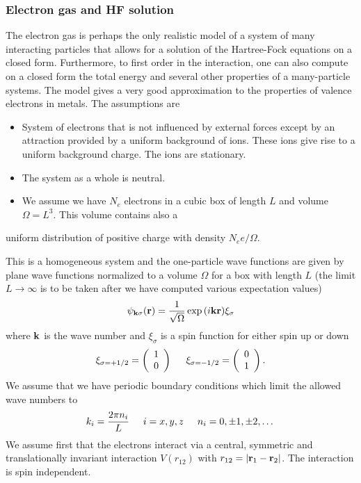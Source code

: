 \documentclass{beamer}
\begin{document}
\begin{frame}
\frametitle{Electron gas and HF solution}

\begin{block}{}
The electron gas is perhaps the only realistic model of a 
system of many interacting particles that allows for a solution
of the Hartree-Fock equations on a closed form. Furthermore, to first order in the interaction, one can also
compute on a closed form the total energy and several other properties of a many-particle systems. 
The model gives a very good approximation to the properties of valence electrons in metals.
The assumptions are

\begin{itemize}
 \item System of electrons that is not influenced by external forces except by an attraction provided by a uniform background of ions. These ions give rise to a uniform background charge. The ions are stationary.

 \item The system as a whole is neutral.

 \item We assume we have $N_e$ electrons in a cubic box of length $L$ and volume $\Omega=L^3$. This volume contains also a
\end{itemize}

\noindent
uniform distribution of positive charge with density $N_ee/\Omega$. 


This is a homogeneous system and the one-particle wave functions are given by plane wave functions normalized to a volume $\Omega$ 
for a box with length $L$ (the limit $L\rightarrow \infty$ is to be taken after we have computed various expectation values)
\[
\psi_{{\bf k}\sigma}({\bf r})= \frac{1}{\sqrt{\Omega}}\exp{(i{\bf kr})}\xi_{\sigma}
\]
where ${\bf k}$ is the wave number and  $\xi_{\sigma}$ is a spin function for either spin up or down
\[ 
\xi_{\sigma=+1/2}=\left(\begin{array}{c} 1 \\ 0 \end{array}\right) \hspace{0.5cm}
\xi_{\sigma=-1/2}=\left(\begin{array}{c} 0 \\ 1 \end{array}\right).
\]
We assume that we have periodic boundary conditions which limit the allowed wave numbers to
\[
k_i=\frac{2\pi n_i}{L}\hspace{0.5cm} i=x,y,z \hspace{0.5cm} n_i=0,\pm 1,\pm 2, \dots
\]
We assume first that the electrons interact via a central, symmetric and translationally invariant
interaction  $V(r_{12})$ with
$r_{12}=|{\bf r}_1-{\bf r}_2|$.  The interaction is spin independent.


\end{block}
\end{frame}
\end{document}
